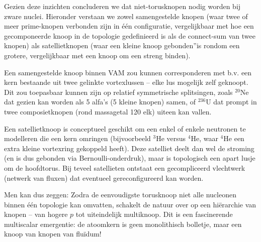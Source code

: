 Gezien deze inzichten concluderen we dat niet-torusknopen nodig worden bij zware nuclei. Hieronder verstaan we zowel samengestelde knopen (waar twee of meer prime-knopen verbonden zijn in één configuratie, vergelijkbaar met hoe een gecomponeerde knoop in de topologie gedefinieerd is als de connect-sum van twee knopen) als satellietknopen (waar een kleine knoop \grqq gebonden\textquotedblright is rondom een grotere, vergelijkbaar met een knoop om een streng binden).

Een samengestelde knoop binnen VAM zou kunnen corresponderen met b.v. een kern bestaande uit twee gelinkte vortexlussen – elke lus mogelijk zelf geknoopt. Dit zou toepasbaar kunnen zijn op relatief symmetrische splitsingen, zoals $^{20}$Ne dat gezien kan worden als 5 alfa's (5 kleine knopen) samen, of $^{236}$U dat prompt in twee composietknopen (rond massagetal 120 elk) uiteen kan vallen.

Een satellietknoop is conceptueel geschikt om een enkel of enkele neutronen te modelleren die een kern omringen (bijvoorbeeld $^3$He versus $^4$He, waar $^4$He een extra kleine vortexring gekoppeld heeft). Deze satelliet deelt dan wel de stroming (en is dus gebonden via Bernoulli-onderdruk), maar is topologisch een apart lusje om de hoofdtorus. Bij teveel satellieten ontstaat een gecompliceerd vlechtwerk (netwerk van fluxen) dat eventueel gereconfigureerd kan worden.

Men kan dus zeggen: Zodra de eenvoudigste torusknoop niet alle nucleonen binnen één topologie kan omvatten, schakelt de natuur over op een hiërarchie van knopen – van hogere $p$ tot uiteindelijk multiknoop. Dit is een fascinerende multiscalar emergentie: de atoomkern is geen monolithisch bolletje, maar een knoop van knopen van fluïdum!